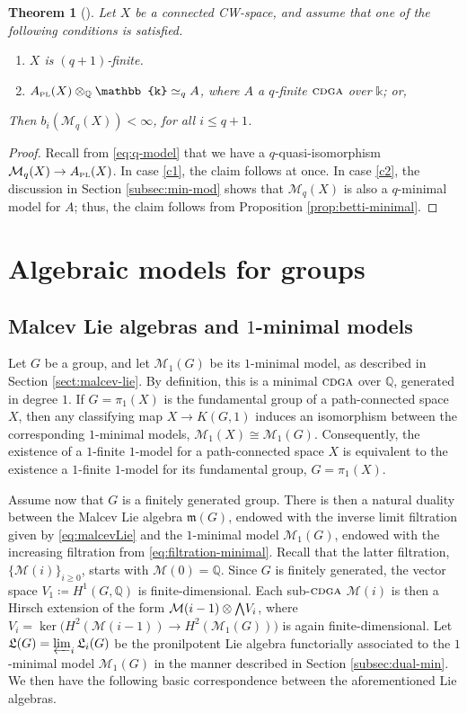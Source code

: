 \documentclass{article}
\numberwithin{equation}{section}
\newtheorem{theorem}{Theorem}[section]
\theoremstyle{definition}
\newcommand{\Q}{\mathbb{Q}}
\renewcommand{\k}{\mathbb{k}}
\newcommand{\M}{\mathcal{M}}
\newcommand{\m}{{\mathfrak{m}}}
\newcommand{\fL}{\mathfrak{L}}
\newcommand{\cdga}{\ensuremath{\textsc{cdga}}}
\newcommand{\apl}{A_{\scriptscriptstyle{{\rm PL}}}}
\newcommand{\bwedge}{\mbox{\normalsize $\bigwedge$}}
\begin{document}
\begin{theorem}[\cite{PS-jlms}]
\label{thm:infobsq}
Let $X$ be a connected CW-space, and 
assume that one of the following conditions is satisfied.
\begin{enumerate}
\item  \label{c1}
 $X$ is $(q+1)$-finite. 
 
\item  \label{c2}
$\apl (X)\otimes_{\Q} \k\simeq_q A$, where $A$ a $q$-finite 
$\cdga$ over $\k$; or,
\end{enumerate}
Then $b_i(\M_q(X))< \infty$, for all $i\le q+1$.
\end{theorem}

\begin{proof}
Recall from \eqref{eq:q-model} that we have a $q$-quasi-isomorphism 
$\M_q(X)\to \apl(X)$. In case \ref{c1}, the claim follows at once. 
In case \ref{c2}, the discussion in Section \ref{subsec:min-mod} 
shows that $\M_q(X)$ is also a $q$-minimal model for $A$; 
thus, the claim follows from Proposition \ref{prop:betti-minimal}.
\end{proof}

\section{Algebraic models for groups}
\label{sect:algmod-groups}

\subsection{Malcev Lie algebras and $1$-minimal models}
\label{subsec:malcev-min}
Let $G$ be a group, and let $\M_1(G)$ be its $1$-minimal model, 
as described in Section \ref{sect:malcev-lie}.  By definition, this is 
a minimal $\cdga$ over $\Q$, generated in degree $1$. 
If $G=\pi_1(X)$ is the fundamental group of a path-connected 
space $X$, then any classifying map $X\to K(G,1)$ induces an isomorphism 
between the corresponding $1$-minimal models, $\M_1(X)\cong \M_1(G)$.
Consequently, the existence of a $1$-finite $1$-model for a path-connected 
space $X$ is equivalent to the existence a $1$-finite $1$-model for its fundamental 
group, $G=\pi_1(X)$. 

Assume now that $G$ is a finitely generated group. 
There is then a natural duality between the Malcev Lie 
algebra $\m (G)$, endowed with the inverse limit filtration 
given by \eqref{eq:malcevLie} and the $1$-minimal model $\M_1(G)$, 
endowed with the increasing filtration from \eqref{eq:filtration-minimal}. 
Recall that the latter filtration, $\{\M(i)\}_{i\ge 0}$, starts with $\M(0)=\Q$. 
Since $G$ is finitely generated, the vector space $V_1\coloneqq H^1(G,\Q)$ 
is finite-dimensional. Each sub-$\cdga$ $\M(i)$ is then a Hirsch extension 
of the form $\M(i-1)\otimes \bwedge V_{i}$, where 
$V_i =\ker\big(H^2(\M(i-1))\to H^2(\M_1(G))\big)$ is again finite-dimensional. 
Let $\fL(G)=\varprojlim_i \fL_i(G)$ be the 
pronilpotent Lie algebra functorially associated to the $1$-minimal 
model $\M_1(G)$ in the manner described in 
Section \ref{subsec:dual-min}. We then have the following 
basic correspondence between the aforementioned Lie algebras.
\end{document}
